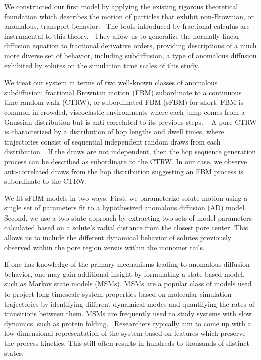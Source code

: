 \documentclass[journal=jctcce,manuscript=article]{achemso}
\begin{document}
  We constructed our first model by applying the existing rigorous theoretical
  foundation which describes the motion of particles that exhibit non-Brownian,
  or anomalous, transport behavior.~\cite{metzler_random_2000,bouchaud_anomalous_1990} 
  The tools introduced by fractional calculus are instrumental to this 
  theory.~\cite{gorenflo_fractional_1997} They allow us to generalize the normally
  linear diffusion equation to fractional derivative orders, providing descriptions
  of a much more diverse set of behavior, including subdiffusion, a type of 
  anomalous diffusion exhibited by solutes on the simulation time scales of this
  study.~\cite{klages_anomalous_2008}

  We treat our system in terms of two well-known classes of anomalous
  subdiffusion: fractional Brownian motion (FBM) subordinate to a 
  continuous time random walk (CTRW), or subordinated FBM (sFBM) for short. 
  FBM is common in crowded, viscoelastic environments where each jump comes 
  from a Gaussian distribution but is anti-correlated to its previous steps.
  ~\cite{mandelbrot_fractional_1968,jeon_fractional_2010,banks_anomalous_2005}
  A pure CTRW is characterized by a distribution of hop lengths and dwell times, 
  where trajectories consist of sequential independent random draws from each
  distribution.~\cite{montroll_random_1965} If the draws are not independent,
  then the hop sequence generation process can be described as subordinate to
  the CTRW. In our case, we observe anti-correlated draws from the hop distribution
  suggesting an FBM process is subordinate to the CTRW.

  We fit sFBM models in two ways: First, we parameterize solute motion using
  a single set of parameters fit to a hypothesized anomalous diffusion (AD) model.
  Second, we use a two-state approach by extracting two sets of model parameters
  calculated based on a solute's radial distance from the closest pore center. 
  This allows us to include the different dynamical behavior of solutes previously
  observed within the pore region versus within the monomer tails.
  
  If one has knowledge of the primary mechanisms leading to anomalous diffusion
  behavior, one may gain additional insight by formulating a state-based model,
  such as Markov state models (MSMs). MSMs are a popular class of models used
  to project long timescale system properties based on molecular simulation
  trajectories by identifying different dynamical modes and quantifying the
  rates of transitions between them. MSMs are frequently used to study systems
  with slow dynamics, such as protein
  folding.~\cite{snow_how_2005,chodera_automatic_2007} Researchers typically
  aim to come up with a low dimensional representation of the system based on
  features which preserve the process kinetics. This still often results in
  hundreds to thousands of distinct states.~\cite{chodera_markov_2014}
\end{document}
